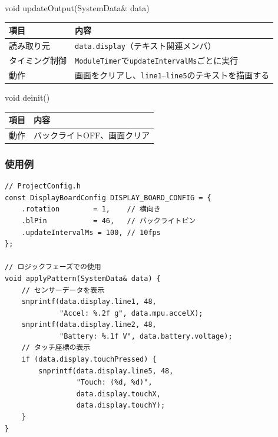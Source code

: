 \begin{funcblock}{void updateOutput(SystemData\& data)}
\begin{tabularx}{\textwidth}{l X}
\toprule
\textbf{項目} & \textbf{内容} \\
\midrule
読み取り元     & \texttt{data.display}（テキスト関連メンバ） \\
タイミング制御 & \texttt{ModuleTimer}で\texttt{updateIntervalMs}ごとに実行 \\
動作           & 画面をクリアし、\texttt{line1}--\texttt{line5}のテキストを描画する \\
\bottomrule
\end{tabularx}
\end{funcblock}

\begin{funcblock}{void deinit()}
\begin{tabularx}{\textwidth}{l X}
\toprule
\textbf{項目} & \textbf{内容} \\
\midrule
動作   & バックライトOFF、画面クリア \\
\bottomrule
\end{tabularx}
\end{funcblock}

\subsubsection{使用例}

\begin{lstlisting}[style=cppstyle, caption={DisplayBoardModuleの使用例}]
// ProjectConfig.h
const DisplayBoardConfig DISPLAY_BOARD_CONFIG = {
    .rotation        = 1,    // 横向き
    .blPin           = 46,   // バックライトピン
    .updateIntervalMs = 100, // 10fps
};

// ロジックフェーズでの使用
void applyPattern(SystemData& data) {
    // センサーデータを表示
    snprintf(data.display.line1, 48,
             "Accel: %.2f g", data.mpu.accelX);
    snprintf(data.display.line2, 48,
             "Battery: %.1f V", data.battery.voltage);
    // タッチ座標の表示
    if (data.display.touchPressed) {
        snprintf(data.display.line5, 48,
                 "Touch: (%d, %d)",
                 data.display.touchX,
                 data.display.touchY);
    }
}
\end{lstlisting}
